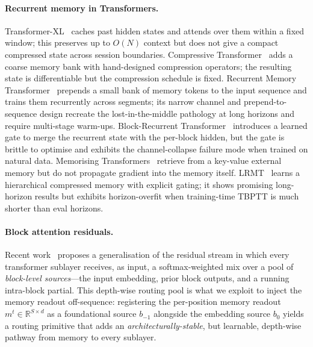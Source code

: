 \documentclass{article}
\begin{document}
\paragraph{Recurrent memory in Transformers.}
Transformer-XL~\cite{daiTransformerXL2019} caches past hidden states
and attends over them within a fixed window; this preserves up to
$O(N)$ context but does not give a compact compressed state across
session boundaries. Compressive Transformer~\cite{rae2019compressive}
adds a coarse memory bank with hand-designed compression operators;
the resulting state is differentiable but the compression schedule is
fixed. Recurrent Memory Transformer~\cite{bulatov2022rmt} prepends a
small bank of memory tokens to the input sequence and trains them
recurrently across segments; its narrow channel and prepend-to-sequence
design recreate the lost-in-the-middle pathology at long horizons and
require multi-stage warm-ups. Block-Recurrent
Transformer~\cite{hutchins2022blockrecurrent} introduces a learned
gate to merge the recurrent state with the per-block hidden, but the
gate is brittle to optimise and exhibits the channel-collapse failure
mode when trained on natural data. Memorising
Transformers~\cite{wu2022memorising} retrieve from a key-value
external memory but do not propagate gradient into the memory itself.
LRMT~\cite{xie2024lrmt} learns a hierarchical compressed memory with
explicit gating; it shows promising long-horizon results but exhibits
horizon-overfit when training-time TBPTT is much shorter than eval
horizons.

\paragraph{Block attention residuals.}
Recent work~\cite{du2025blockattnres} proposes a generalisation of
the residual stream in which every transformer sublayer receives, as
input, a softmax-weighted mix over a pool of \emph{block-level
sources}---the input embedding, prior block outputs, and a running
intra-block partial. This depth-wise routing pool is what we exploit
to inject the memory readout off-sequence: registering the
per-position memory readout $m^t \in \mathbb{R}^{S \times d}$ as a
foundational source $b_{-1}$ alongside the embedding source $b_0$
yields a routing primitive that adds an
\emph{architecturally-stable}, but learnable, depth-wise pathway from
memory to every sublayer.
\end{document}
